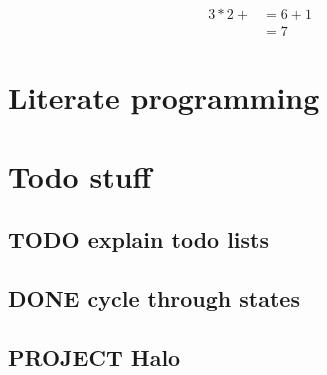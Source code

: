 \documentclass[11pt]{article}
\begin{document}
\begin{align*}
   3 * 2 + &= 6 + 1 \\
           &= 7
\end{align*}

\section{Literate programming}
\label{sec:org6bb9819}

\section{Todo stuff}
\label{sec:orgb9ce359}
\subsection{{\bfseries\sffamily TODO} explain todo lists}
\label{sec:orgd925586}
\subsection{{\bfseries\sffamily DONE} cycle through states}
\label{sec:orgcb95fc3}
\subsection{{\bfseries\sffamily PROJECT} Halo}
\label{sec:org36fdf31}
\end{document}
